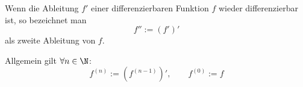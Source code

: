 Wenn die Ableitung $f'$ einer differenzierbaren Funktion $f$ wieder differenzierbar ist, so bezeichnet man
$$f'' := (f')'$$
als zweite Ableitung von $f$.\par
Allgemein gilt $\forall n \in \N$:
$$f^{(n)} := (f^{(n-1)})', \qquad f^{(0)} := f$$
